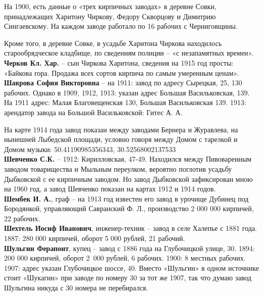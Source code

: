 На 1900, есть данные о «трех кирпичных заводах» в деревне Совки, принадлежащих Харитону Чиркову, Федору Скворцову и Димитрию Сингаевскому. На каждом заводе работало по 16 рабочих с Черниговщины.

Кроме того, в деревне Совке, в усадьбе Харитона Чиркова находилось старообрядческое кладбище, по сведениям полиции – «с незапамятных времен».\\

\noindent\textbf{Черков Кл. Хар.} – сын Чиркова Харитона, сведения на 1915 год просты: «Байкова гора. Продажа всех сортов кирпича по самым умеренным ценам».\\

\noindent\textbf{Шаврова София Викторовна} – на 1911: завод по адресу Сырецкая, 25, 130 рабочих. Однако в 1909, 1912, 1913: указан адрес Большая Васильковская, 139. На 1911 адрес: Малая Благовещенская 130, Большая Васильковская 139. 1913: арендатор завода на Большой Васильковской: Гитес А. А.

На карте 1914 года завод показан между заводами Бернера и Журавлева, на нынешней Лыбедской площади, условно говоря между Домом с тарелкой и Домом музыки: 50.41190985356343, 30.52568002137533\\

\noindent\textbf{Шевченко С.К.} – 1912: Кирилловская, 47-49. Находился между Пивоваренным заводом товарищества и Мыльным переулком, вероятно поглотив усадьбу Дыбковской с ее кирпичным заводом. Но завод Дыбковской зафиксирован мною на 1960 год, а завод Шевченко показан на картах 1912 и 1914 годов.\\ 

\noindent\textbf{Шембек И. А.}, граф – на 1913 год известен его завод в урочище Дубинец под Бородянкой, управляющий Савранский Ф. Л., производство 2 000 000 кирпичей, 22 рабочих.\\

\noindent\textbf{Шехтель Иосиф Иванович}, инженер-техник – завод в селе Халепье с 1881 года. 1887: 280 000 кирпичей, оборот 5 000 рублей, 21 рабочий.\\

\noindent\textbf{Шульгин Ферапонт}, купец – завод с 1886 года на Глубочицкой улице, 30. 1894: 200 000 кирпичей, оборот \mbox{2 000} рублей, 6 рабочих. 1900: 8 местных рабочих. 1907: адрес указан Глубочицкое шоссе, 40. Вместо «Шульгин» в одном источнике стоит «Шукагин» при заводе по номеру 30 за тот же 1907, так что думаю завод Шульгина никуда с 30 номера не перебирался.\\


